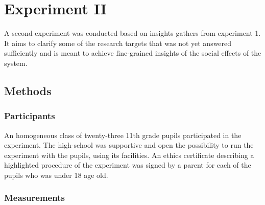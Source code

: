 \documentclass[a4paper,11pt]{article}
\begin{document}
{\section{Experiment II}

A second experiment was conducted based on insights gathers from experiment 1.
It aims to clarify some of the research targets that was not yet answered sufficiently and is meant to achieve fine-grained insights of the social effects of the system.

\subsection{Methods}\label{methods:evaluation}

\subsubsection{Participants}

An homogeneous class of twenty-three 11th grade pupils participated in the experiment.
The high-school was supportive and open the possibility to run the experiment with the pupils, using its facilities.
An ethics certificate describing a highlighted procedure of the experiment was signed by a parent for each of the pupils who was under 18 age old.

\subsubsection{Measurements}

}
\end{document}
